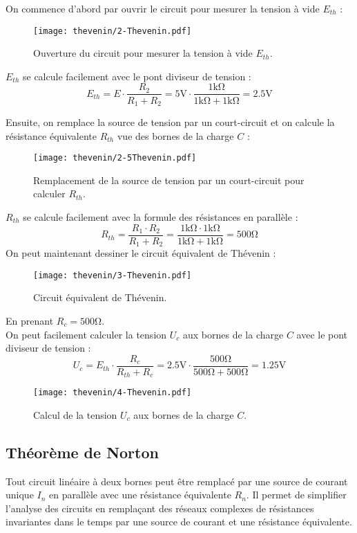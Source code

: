 On commence d'abord par ouvrir le circuit pour mesurer la tension à vide \(E_{th}\) :
\begin{figure}[H]
    \centering
    \texttt{[image: thevenin/2-Thevenin.pdf]}
    \caption{Ouverture du circuit pour mesurer la tension à vide \(E_{th}\).}
\end{figure}
\(E_{th}\) se calcule facilement avec le pont diviseur de tension :
\[
E_{th} = E \cdot \frac{R_2}{R_1+R_2} = 5\unit{\volt} \cdot \frac{1\unit{\kilo\ohm}}{1\unit{\kilo\ohm}+1\unit{\kilo\ohm}} = 2.5\unit{\volt}
\]

Ensuite, on remplace la source de tension par un court-circuit et on calcule la
résistance équivalente \(R_{th}\) vue des bornes de la charge \(C\) :
\begin{figure}[H]
    \centering
    \texttt{[image: thevenin/2-5Thevenin.pdf]}
    \caption{Remplacement de la source de tension par un court-circuit pour calculer \(R_{th}\).}
\end{figure}
\(R_{th}\) se calcule facilement avec la formule des résistances en parallèle :
\[
R_{th} = \frac{R_1 \cdot R_2}{R_1 + R_2} = \frac{1\unit{\kilo\ohm} \cdot 1\unit{\kilo\ohm}}{1\unit{\kilo\ohm} + 1\unit{\kilo\ohm}} = 500\unit{\ohm}
\]
On peut maintenant dessiner le circuit équivalent de Thévenin :
\begin{figure}[H]
    \centering
    \texttt{[image: thevenin/3-Thevenin.pdf]}
    \caption{Circuit équivalent de Thévenin.}
    \label{fig:thevenin-equivalent}
\end{figure}
En prenant \(R_c=500\unit{\ohm}\).\\
On peut facilement calculer la tension \(U_{c}\) aux bornes de la charge \(C\) avec le pont diviseur de tension :
\[
U_{c} = E_{th} \cdot \frac{R_c}{R_{th} + R_c} = 2.5\unit{\volt} \cdot \frac{500\unit{\ohm}}{500\unit{\ohm} + 500\unit{\ohm}} = 1.25\unit{\volt}
\]

\begin{figure}[H]
    \centering
    \texttt{[image: thevenin/4-Thevenin.pdf]}
    \caption{Calcul de la tension \(U_{c}\) aux bornes de la charge \(C\).}
\end{figure}



\subsection{Théorème de Norton}

Tout circuit linéaire à deux bornes peut être remplacé par une source de courant
unique \(I_{n}\) en parallèle avec une résistance équivalente \(R_{n}\). Il permet
de simplifier l’analyse des circuits en remplaçant des réseaux complexes de r\'esistances
invariantes dans le temps par une source de courant et une résistance équivalente.

